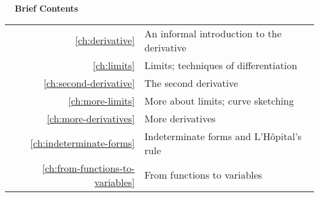 \documentclass{fund}
\begin{document}
%

\cleardoublepage





\pagebreak\vspace{100mm}

\hbox{}\noindent\huge\bfseries\sffamily{}\hspace{-2mm}\ \ Brief Contents\\
\hspace{-20mm}\noindent\mynormaltype\Large\sffamily{}\begin{tabular}{rl}
\ref{ch:derivative} & An informal introduction to the derivative \quad \pageref{ch:derivative}\\
\ref{ch:limits} &  Limits; techniques of differentiation \quad \pageref{ch:limits}\\
\ref{ch:second-derivative} & The second derivative \quad \pageref{ch:second-derivative}\\
\ref{ch:more-limits} & More about limits; curve sketching\quad \pageref{ch:more-limits}\\
\ref{ch:more-derivatives} & More derivatives\quad \pageref{ch:more-derivatives}\\
\ref{ch:indeterminate-forms} & Indeterminate forms and L'H\^{o}pital's rule 
                  \quad \pageref{ch:indeterminate-forms} \\
\ref{ch:from-functions-to-variables} & From functions to variables
                  \quad \pageref{ch:from-functions-to-variables}
\end{tabular}
\mynormaltype

\vspace{100mm}\pagebreak

\cleardoublepage

\mynormaltype

\tableofcontents

\mainmatter
  \addtocounter{page}{8} 
\parafmt
\myeqnspacing %
	\renewcommand{\chapdir}{ch01}
	\renewcommand{\chapdir}{ch02}
	\renewcommand{\chapdir}{ch03}
	\renewcommand{\chapdir}{ch04}
	\renewcommand{\chapdir}{ch05}
	\renewcommand{\chapdir}{ch06}
	\formatchtoc{\large}{\quad\contentspage}{4mm} %
	\renewcommand{\chapdir}{ch07}
\end{document}
